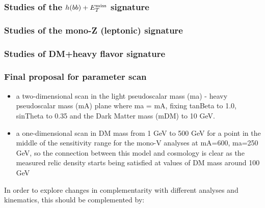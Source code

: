 \subsubsection{Studies of the $h(bb)+E_T^\mathrm{miss}$ signature}


\FloatBarrier
\subsubsection{Studies of the mono-Z (leptonic) signature}

\FloatBarrier

\subsubsection{Studies of DM+heavy flavor signature}



\subsubsection{Final proposal for parameter scan}

\begin{itemize}

\item a two-dimensional scan in the light pseudoscalar mass (ma) -
heavy pseudoscalar mass (mA) plane where ma = mA, fixing tanBeta to 1.0,
sinTheta to 0.35 and the Dark Matter mass (mDM) to 10 GeV.


\item a one-dimensional scan in DM mass from 1 GeV to 500 GeV for a
point in the middle of the sensitivity range for the mono-V analyses at
mA=600, ma=250 GeV, so the connection between this model and cosmology
is clear as the measured relic density starts being satisfied at values
of DM mass around 100 GeV

\end{itemize}


In order to explore changes in complementarity with different
analyses and kinematics, this should be complemented by:

